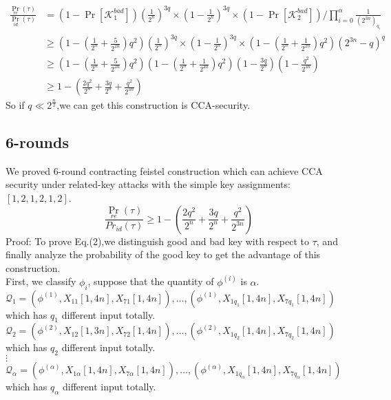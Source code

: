 \begin{align*}
\frac{\Pr_{re}(\tau)}{\Pr_{id}(\tau)}&= (1-\Pr[\mathcal{K}_{1}^{bad}])(\frac{1}{2^{n}})^{3q}\times(1-\frac{1}{2^{n}})^{3q}\times
(1-\Pr[\mathcal{K}_{2}^{bad}]) / \prod_{i=0}^{\alpha}\frac{1}{(2^{3n})_{q_{i}}}\\
&\geq (1-(\frac{1}{2^{n}}+\frac{5}{2^{2n}})q^{2})(\frac{1}{2^{n}})^{3q}\times(1-\frac{1}{2^{n}})^{3q}\times
(1-(\frac{1}{2^{n}}+\frac{1}{2^{2n}})q^{2})(2^{3n}-q)^{q}\\
&\geq(1-(\frac{1}{2^{n}}+\frac{5}{2^{2n}})q^{2})(1-(\frac{1}{2^{n}}+\frac{1}{2^{2n}})q^{2})(1-\frac{3q}{2^{n}})(1-\frac{q^{2}}{2^{3n}})\\
&\geq 1-( \frac{2q^{2}}{2^{n}}+\frac{3q}{2^{n}} +\frac{q^{2}}{2^{3n}})
\end{align*}
So if $q \ll 2^{\frac{n}{2}}$,we can get this construction is CCA-security.


\subsection{6-rounds}
We proved 6-round contracting feistel construction which can achieve CCA security under related-key attacks with the simple key assignments:$[1,2,1,2,1,2]$.\\
\begin{equation}
\frac{\Pr_{re}(\tau)}{Pr_{id}(\tau)}\geq 1-( \frac{2q^{2}}{2^{n}}+\frac{3q}{2^{n}} +\frac{q^{2}}{2^{3n}})
\end{equation}
Proof:
To prove Eq.(2),we distinguish good and bad key with respect to $\tau$, and finally analyze the probability of the good key to get the advantage of this construction.\\

First, we classify $\phi_{i}$, suppose that the quantity of $\phi^{(i)}$ is $\alpha$.\\
$\mathcal{Q}_{1}={(\phi^{(1)},X_{11}[1,4n],X_{71}[1,4n]),\dots,(\phi^{(1)},X_{1q_{1}}[1,4n],X_{7q_{1}}[1,4n])}$ which has $q_{1}$ different input totally.\\
$\mathcal{Q}_{2}={(\phi^{(2)},X_{12}[1,3n],X_{72}[1,4n]),\dots,(\phi^{(2)},X_{1q_{2}}[1,4n],X_{7q_{2}}[1,4n])}$    which has $q_{2}$ different input totally.\\
\quad \quad $\vdots$ \\
$\mathcal{Q}_{\alpha}={(\phi^{(\alpha)},X_{1\alpha}[1,4n],X_{7\alpha}[1,4n]),\dots,(\phi^{(\alpha)},X_{1q_{\alpha}}[1,4n],X_{7q_{\alpha}}[1,4n])}$ which has $q_{\alpha}$ different input totally.\\

